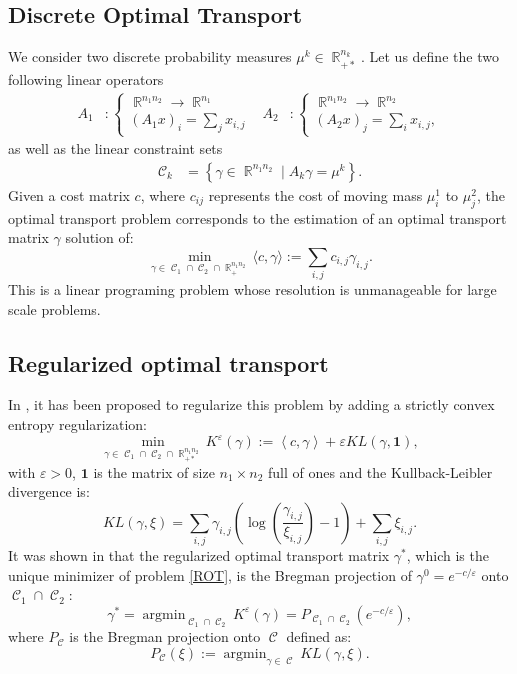 \documentclass{article} %
\newcommand{\scal}[2]{\left\langle #1 , #2 \right\rangle}
\DeclareMathOperator{\IR}{\mathbb{R}}
\DeclareMathOperator*{\argmin}{argmin}
\DeclareMathOperator{\Ccal}{\mathcal{C}}
\renewcommand{\epsilon}{\varepsilon}
\theoremstyle{plain}
\theoremstyle{definition}
\theoremstyle{remark}
\begin{document}
 
\subsection{Discrete Optimal Transport}
We consider two discrete probability measures $\mu^k \in \IR_{+*}^{n_k}$.
Let us define the two following linear operators
\begin{align*}
A_1 &: \begin{cases}
\IR^{n_1 n_2} \rightarrow \IR^{n_1} \\
(A_1 x)_i = \sum_j x_{i,j}
\end{cases} &
A_2 &: \begin{cases}
\IR^{n_1 n_2} \rightarrow \IR^{n_2}\\
(A_2 x)_j = \sum_i x_{i,j},
\end{cases}
\end{align*}
as well as the linear  constraint sets
\begin{align*}
\Ccal_k &= \left\{ \gamma\in\IR^{n_1 n_2} \mid A_k \gamma = \mu^k \right\}.
\end{align*}
Given a cost matrix $c$, where $c_{ij}$ represents the cost of moving mass $\mu^1_i$ to $\mu^2_j$,  the optimal transport problem corresponds to the estimation of an optimal transport matrix $\gamma$ solution of:
$$\min_{\gamma\in\Ccal_1\cap \Ccal_2\cap \IR^{n_1 n_2}_+} \langle c,\gamma\rangle:=\sum_{i,j}c_{i,j}\gamma_{i,j}.$$
This is a linear programing problem whose resolution is unmanageable for large scale problems. 

\subsection{Regularized optimal transport}

In \cite{cuturi13}, it has been proposed to regularize this problem by adding a strictly convex entropy regularization:
\begin{equation}\label{ROT}
\min_{\gamma\in\Ccal_1\cap \Ccal_2\cap \IR^{n_1 n_2}_{+*}}K^\epsilon(\gamma) := \scal{c}{\gamma} 
+ \epsilon KL(\gamma,\mathbf{1})
,\end{equation}
with $\epsilon>0$, $\mathbf{1}$ is the matrix of size $n_1\times n_2$ full of ones and the Kullback-Leibler divergence is:
\begin{equation}\label{KL}
KL(\gamma,\xi) = \sum_{i,j} \gamma_{i,j} \left( \log \left( \frac{\gamma_{i,j}}{\xi_{i,j}} \right) -1  \right) + \sum_{i,j} \xi_{i,j}.
\end{equation}
It was shown in \cite{benamou15}  that the regularized optimal transport matrix $\gamma^*$, which is the unique minimizer of problem \eqref{ROT},  is the Bregman projection of $\gamma^0 = e^{-c/\epsilon}$ onto $\Ccal_1 \cap \Ccal_2$:
\begin{equation}\label{eq:reg_ot_pb}
\gamma^* = \argmin_{\Ccal_1 \cap \Ccal_2} K^\epsilon(\gamma)= P_{\Ccal_1 \cap \Ccal_2} (e^{-c/\epsilon}),
\end{equation}
where $P_{\Ccal}$ is the  Bregman projection onto $\Ccal$ defined as:
\[
P_{\Ccal}(\xi) := \argmin_{\gamma \in \Ccal} KL(\gamma,\xi).
\]
\end{document}
